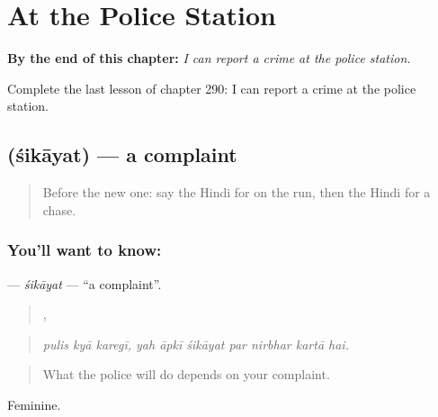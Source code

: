 
\chapter{At the Police Station}
\label{ch:hi-at-the-police-station}

\begin{chapteropening}
\textbf{By the end of this chapter:} \emph{I can report a crime at the police station.}

Complete the last lesson of chapter 290: I can report a crime at the police station.
\end{chapteropening}

\section[\texorpdfstring{\hi{शिकायत} (śikāyat)}{शिकायत (śikāyat)}]{ (śikāyat) — a complaint}

\label{lesson:HI-C290-sikayat}



\begin{quote}
Before the new one: say the Hindi for on the run, then the Hindi for a chase.
\end{quote}

\subsection*{You'll want to know: }
\textbf{} — \emph{śikāyat} — \textquotedblleft{}a complaint\textquotedblright{}.

\begin{quote}
  ,       
\end{quote}

\begin{quote}
\emph{pulis kyā karegī, yah āpkī śikāyat par nirbhar kartā hai.}
\end{quote}

\begin{quote}
What the police will do depends on your complaint.
\end{quote}

Feminine.

